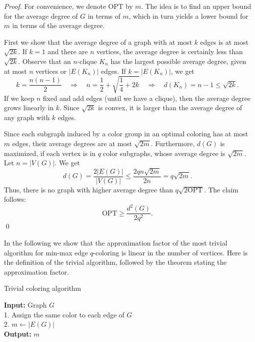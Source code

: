 \documentclass[runningheads, a4paper]{llncs}
\begin{document}
\begin{proof}
For convenience, we denote OPT by $m$. The idea is to find an upper bound for the average degree of $G$ in terms of $m$, which in turn yields a lower bound for $m$ in terms of the average degree.

First we show that the average degree of a graph with at most $k$ edges is at most $\sqrt{2k}$. If $k=1$ and there are $n$ vertices, the average degree is certainly less than $\sqrt{2k}$. Observe that an $n$-clique $K_n$ has the largest possible average degree, given at most $n$ vertices or $|E(K_n)|$ edges. If $k = |E(K_n)|$, we get
\begin{displaymath}
k = \frac{n(n-1)}{2} \quad \Rightarrow \quad n = \frac{1}{2} + \sqrt{\frac{1}{4} + 2k} \quad \Rightarrow \quad d(K_n) = n - 1 \leq \sqrt{2k}.
\end{displaymath}
If we keep $n$ fixed and add edges (until we have a clique), then the average degree grows linearly in $k$. Since $\sqrt{2k}$ is convex, it is larger than the average degree of any graph with $k$ edges. 



Since each subgraph induced by a color group in an optimal coloring has at most $m$ edges, their average degrees are at most $\sqrt{2m}$. Furthermore, $d(G)$ is maximized, if each vertex is in $q$ color subgraphs, whose average degree is $\sqrt{2m}$. Let $n = |V(G)|$. We get
\begin{displaymath}
d(G) = \frac{2|E(G)|}{|V(G)|} \leq \frac{2qn\sqrt{2m}}{2n} = q\sqrt{2m}.
\end{displaymath}
Thus, there is no graph with higher average degree than $q\sqrt{2\textrm{OPT}}$. The claim follows:
\begin{displaymath}
\textrm{OPT} \geq \frac{d^2(G)}{2q^2}.
\end{displaymath} \qed
\end{proof}



In the following we show that the approximation factor of the most trivial algorithm for min-max edge $q$-coloring is linear in the number of vertices. Here is the definition of the trivial algorithm, followed by the theorem stating the approximation factor.

\begin{algorithm}
\caption{Trivial coloring algorithm}
\label{alg:trivial}
\textbf{Input:} Graph $G$ \\
1. Assign the same color to each edge of $G$ \\
2. $m \longleftarrow |E(G)|$ \\
\textbf{Output:} $m$
\end{algorithm}
\end{document}
